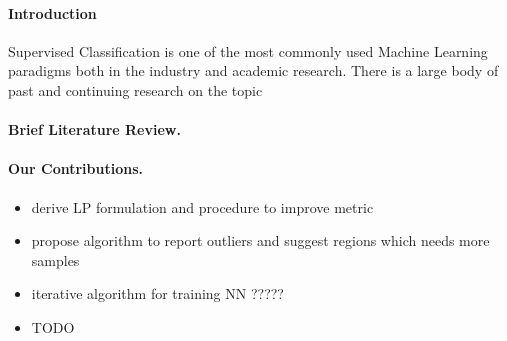 \documentclass{article}
\begin{document}
\paragraph{Introduction}  
Supervised Classification is one of the most commonly used Machine Learning paradigms both in the industry and academic research. There is a large body of past and continuing research on the topic







\paragraph{Brief Literature Review.}


\cite{weinberger2005distance}



\cite{xing2003distance}




\cite{weinberger2009distance}



\cite{yang2006efficient}

\cite{ying2012distance}


\cite{schultz2004learning}

\cite{rosales2006learning}



 
\paragraph{Our Contributions.} 
 
 
 
\begin{itemize}
\item derive LP formulation and procedure to improve metric
\item propose algorithm to report outliers and suggest regions which needs more samples

\item iterative algorithm for training NN ?????

\item TODO
\end{itemize} 
 
\end{document}
